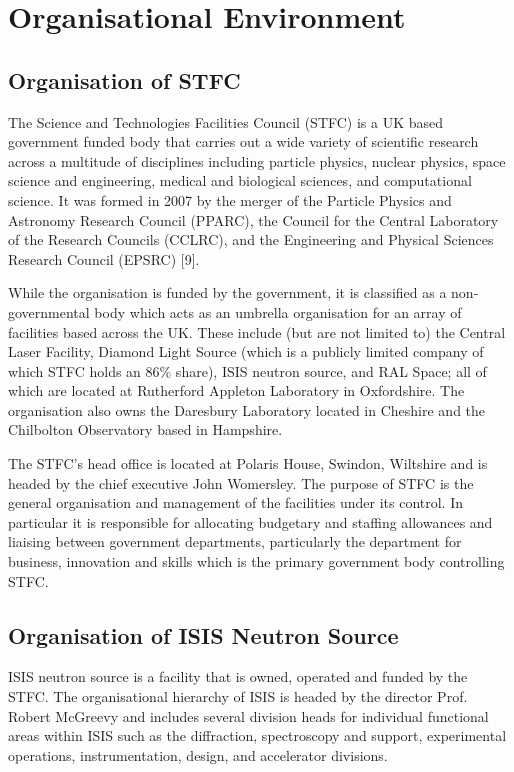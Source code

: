 \documentclass[paper=a4, fontsize=11pt]{scrartcl}	%
\numberwithin{equation}{section}															%
\numberwithin{figure}{section}																%
\numberwithin{table}{section}
\begin{document}
\clearpage
\section{Organisational Environment}\label{organisational-environment}

\subsection{Organisation of STFC}\label{organisation-of-stfc}

The Science and Technologies Facilities Council (STFC) is a UK based
government funded body that carries out a wide variety of scientific
research across a multitude of disciplines including particle physics,
nuclear physics, space science and engineering, medical and biological
sciences, and computational science. It was formed in 2007 by the merger
of the Particle Physics and Astronomy Research Council (PPARC), the
Council for the Central Laboratory of the Research Councils (CCLRC), and
the Engineering and Physical Sciences Research Council (EPSRC) {[}9{]}.

While the organisation is funded by the government, it is classified as
a non-governmental body which acts as an umbrella organisation for an
array of facilities based across the UK. These include (but are not
limited to) the Central Laser Facility, Diamond Light Source (which is a
publicly limited company of which STFC holds an 86\% share), ISIS
neutron source, and RAL Space; all of which are located at Rutherford
Appleton Laboratory in Oxfordshire. The organisation also owns the
Daresbury Laboratory located in Cheshire and the Chilbolton Observatory
based in Hampshire.

The STFC's head office is located at Polaris House, Swindon, Wiltshire
and is headed by the chief executive John Womersley. The purpose of STFC is
the general organisation and management of the facilities under its
control. In particular it is responsible for allocating budgetary and
staffing allowances and liaising between government departments,
particularly the department for business, innovation and skills which is
the primary government body controlling STFC.

\subsection{Organisation of ISIS Neutron
Source}\label{organisation-of-isis-neutron-source}

ISIS neutron source is a facility that is owned, operated and funded by
the STFC. The organisational hierarchy of ISIS is headed by the director
Prof. Robert McGreevy and includes several division heads for individual
functional areas within ISIS such as the diffraction, spectroscopy and
support, experimental operations, instrumentation, design, and
accelerator divisions.
\end{document}

